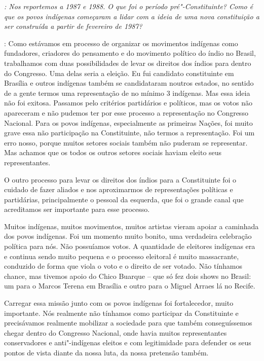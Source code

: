 \emph{: Nos reportemos a 1987 e 1988. O que foi o período
pré"-Constituinte? Como é que os povos indígenas começaram a lidar com a
ideia de uma nova constituição a ser construída a partir de fevereiro de
1987?}

: Como estávamos em processo de organizar os movimentos
indígenas como fundadores, criadores do pensamento e do movimento
político do índio no Brasil, trabalhamos com duas possibilidades de
levar os direitos dos índios para dentro do Congresso. Uma delas seria a
eleição. Eu fui candidato constituinte em Brasília e outros indígenas
também se candidataram noutros estados, no sentido de a gente termos uma
representação de no mínimo 3 indígenas. Mas essa ideia não foi exitosa.
Passamos pelo critérios partidários e políticos, mas os votos não
apareceram e não pudemos ter por esse processo a representação no
Congresso Nacional. Para os povos indígenas, especialmente as primeiras
Nações, foi muito grave essa não participação na Constituinte, não
termos a representação. Foi um erro nosso, porque muitos setores sociais
também não puderam se representar. Mas achamos que os todos os outros
setores sociais haviam eleito seus representantes.

O outro processo para levar os direitos dos índios para a Constituinte
foi o cuidado de fazer aliados e nos aproximarmos de representações
políticas e partidárias, principalmente o pessoal da esquerda, que foi o
grande canal que acreditamos ser importante para esse processo.

Muitos indígenas, muitos movimentos, muitos artistas vieram apoiar a
caminhada dos povos indígenas. Foi um momento muito bonito, uma
verdadeira celebração política para nós. Não possuíamos votos. A
quantidade de eleitores indígenas era e continua sendo muito pequena e o
processo eleitoral é muito massacrante, conduzido de forma que viola o
voto e o direito de ser votado. Não tínhamos chance, mas tivemos apoio
do Chico Buarque -- que só fez dois shows no Brasil: um para o Marcos
Terena em Brasília e outro para o Miguel Arraes lá no Recife.

Carregar essa missão junto com os povos indígenas foi fortalecedor,
muito importante. Nós realmente não tínhamos como participar da
Constituinte e precisávamos realmente mobilizar a sociedade para que
também conseguíssemos chegar dentro do Congresso Nacional, onde havia
muitos representantes conservadores e anti"-indígenas eleitos e com
legitimidade para defender os seus pontos de vista diante da nossa luta,
da nossa pretensão também.

